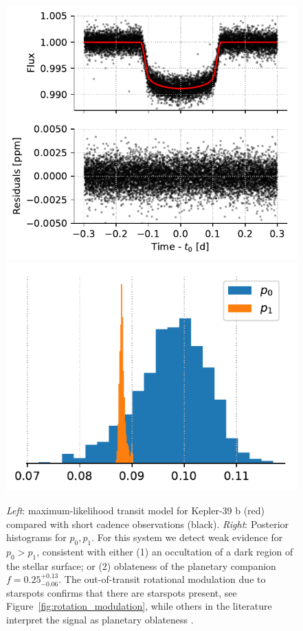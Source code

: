 \begin{figure}%
    \centering
    \includegraphics[scale=0.75]{robin/kepler39_residuals_ld.pdf}
    \includegraphics[scale=0.75]{robin/kepler39_agreement_ld.pdf}
    \caption{\textsl{Left}: maximum-likelihood transit model for Kepler-39 b (red) compared with \kepler short cadence observations (black). \textsl{Right}: Posterior histograms for $p_0, p_1$. For this system we detect weak evidence for $p_0 > p_1$, consistent with either (1) an occultation of a dark region of the stellar surface; or (2) oblateness of the planetary companion $f = {0.25}^{+0.13}_{-0.06}$. The out-of-transit rotational modulation due to starspots confirms that there are starspots present, see Figure~\ref{fig:rotation_modulation}, while others in the literature interpret the signal as planetary oblateness \citep{Zhu2014}.}
    \label{fig:kepler39_lc}
\end{figure}

